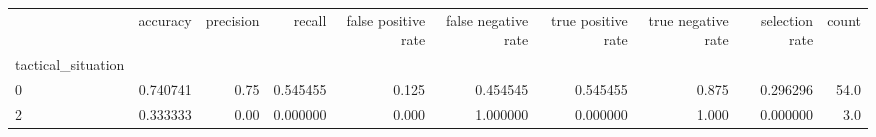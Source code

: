\begin{tabular}{lrrrrrrrrr}
\toprule
{} &  accuracy &  precision &    recall &  false positive rate &  false negative rate &  true positive rate &  true negative rate &  selection rate &  count \\
tactical\_situation &           &            &           &                      &                      &                     &                     &                 &        \\
\midrule
0                  &  0.740741 &       0.75 &  0.545455 &                0.125 &             0.454545 &            0.545455 &               0.875 &        0.296296 &   54.0 \\
2                  &  0.333333 &       0.00 &  0.000000 &                0.000 &             1.000000 &            0.000000 &               1.000 &        0.000000 &    3.0 \\
\bottomrule
\end{tabular}
